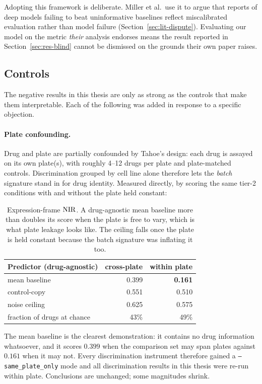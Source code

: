 Adopting this framework is deliberate. Miller et al.\ use it to argue that reports of deep models
failing to beat uninformative baselines reflect miscalibrated evaluation rather than model failure
(Section~\ref{sec:lit-dispute}). Evaluating our model on the metric \emph{their} analysis endorses
means the result reported in Section~\ref{sec:res-blind} cannot be dismissed on the grounds their
own paper raises.

\subsection{Controls}
\label{sec:methods-controls}

The negative results in this thesis are only as strong as the controls that make them
interpretable. Each of the following was added in response to a specific objection.

\paragraph{Plate confounding.} Drug and plate are partially confounded by Tahoe's design: each drug
is assayed on its own plate(s), with roughly 4--12 drugs per plate and plate-matched controls.
Discrimination grouped by cell line alone therefore lets the \emph{batch} signature stand in for
drug identity. Measured directly, by scoring the same tier-2 conditions with and without the plate
held constant:

\begin{table}[h]
\centering
\begin{tabular}{lrr}
\toprule
Predictor (drug-agnostic) & cross-plate & within plate \\
\midrule
mean baseline & 0.399 & \textbf{0.161} \\
control-copy & 0.551 & 0.510 \\
\midrule
noise ceiling & 0.625 & 0.575 \\
fraction of drugs at chance & 43\% & 49\% \\
\bottomrule
\end{tabular}
\caption{Expression-frame $\textrm{NIR}$. A drug-agnostic mean baseline more than doubles its score when the
plate is free to vary, which is what plate leakage looks like. The ceiling falls once the plate is
held constant because the batch signature was inflating it too.}
\label{tab:plateleak}
\end{table}

The mean baseline is the clearest demonstration: it contains no drug information whatsoever, and it
scores $0.399$ when the comparison set may span plates against $0.161$ when it may not. Every
discrimination instrument therefore gained a \texttt{--same\_plate\_only} mode and all discrimination
results in this thesis were re-run within plate. Conclusions are unchanged; some magnitudes shrink.

